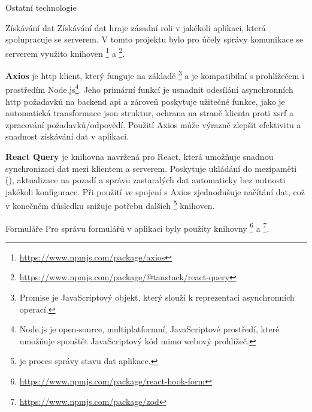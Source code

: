 \begin{subsection}{Ostatní technologie}
    \begin{subsubsection}{Získávání dat}
        \label{subsubsec:implementace-technologie-ostatni-ziskavani}
        Získávání dat hraje zásadní roli v jakékoli aplikaci, která spolupracuje se serverem.
        V tomto projektu bylo pro účely správy komunikace se serverem využito knihoven \footnote{\url{https://www.npmjs.com/package/axios}} a \footnote{\url{https://www.npmjs.com/package/@tanstack/react-query}}.

        \textbf{Axios} je \ac{http} klient, který funguje na základě \footnote{Promise je JavaScriptový objekt, který slouží k reprezentaci asynchronních operací.} a je kompatibilní s prohlížečem i prostředím Node.js\footnote{Node.js je open-source, multiplatformní, JavaScriptové prostředí, které umožňuje spouštět JavaScriptový kód mimo webový prohlížeč\cite{n__nodejs_org}.}.
        Jeho primární funkcí je usnadnit odesílání asynchronních \ac{http} požadavků na backend \ac{api} a zároveň poskytuje užitečné funkce, jako je automatická transformace \ac{json} struktur, ochrana na straně klienta proti \ac{xsrf} a zpracování požadavků/odpovědí.
        Použití Axios může výrazně zlepšit efektivitu a snadnost získávání dat v aplikaci.

        \textbf{React Query} je knihovna navržená pro React, která umožňuje snadnou synchronizaci dat mezi klientem a serverem.
        Poskytuje ukládání do mezipaměti (), aktualizace na pozadí a správu zastaralých dat automaticky bez nutnosti jakékoli konfigurace.
        Při použití ve spojení s Axios zjednodušuje načítání dat, což v konečném důsledku snižuje potřebu dalších \footnote{ je proces správy stavu dat aplikace.} knihoven.
    \end{subsubsection}

    \begin{subsubsection}{Formuláře}
        \label{subsubsec:implementace-technologie-ostatni-formulare}
        Pro správu formulářů v aplikaci byly použity knihovny \footnote{\url{https://www.npmjs.com/package/react-hook-form}} a \footnote{\url{https://www.npmjs.com/package/zod}}.


\end{subsubsection}
\end{subsection}
